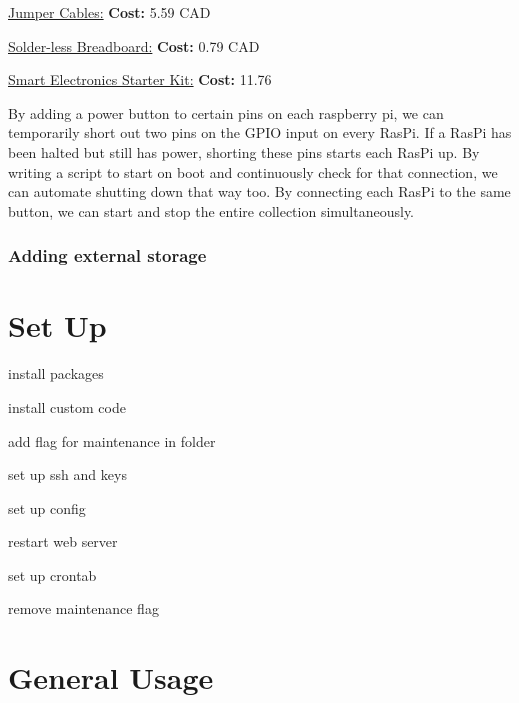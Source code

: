 \documentclass{report}
\begin{document}
\noindent\href{https://www.amazon.ca/Phantom-dupont-cable-200mm-female/dp/B00A6SOGC4/ref=sr_1_15?hvadid=230004442973&hvdev=c&hvlocphy=9000813&hvnetw=g&hvpos=1t1&hvqmt=b&hvrand=15576122632339254&hvtargid=kwd-297377388458&keywords=raspberry+pi+jumper+wires&qid=1550182673&s=gateway&sr=8-15&tag=googcana-20}{Jumper Cables:}
{\bf Cost: } 5.59 CAD


\noindent\href{https://www.amazon.ca/Professional-Solderless-Breadboard-Tie-Points-Universal/dp/B079QWRXNH/ref=sr_1_1?crid=HCN2BMNF27EN&keywords=solderless+breadboard&qid=1550182787&s=electronics&sprefix=solderless\%2Celectronics\%2C149&sr=1-1}{Solder-less Breadboard:}
{\bf Cost: }  0.79 CAD


\noindent\href{https://www.amazon.ca/Electronics-Starter-Breadboard-Jumper-Button/dp/B07GNFY9PM/ref=sr_1_5?keywords=breadboard+buttons&qid=1550191220&s=electronics&sr=1-5}{Smart Electronics Starter Kit:}
{\bf Cost: } 11.76 

By adding a power button to certain pins on each raspberry pi, we can temporarily short out two pins on the GPIO input on every RasPi. If a RasPi has been halted but still has power, shorting these pins starts each RasPi up. By writing a script to start on boot and continuously check for that connection, we can automate shutting down that way too. By connecting each RasPi to the same button, we can start and stop the entire collection simultaneously.

\subsection{Adding external storage}

\chapter{Set Up}

install packages

install custom code

add flag for maintenance in folder

set up ssh and keys

set up config

restart web server

set up crontab

remove maintenance flag


\chapter{General Usage}
\end{document}
